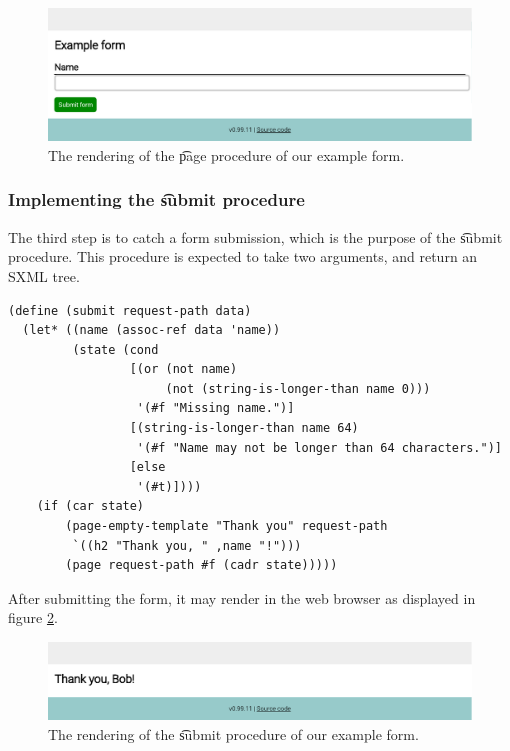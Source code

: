   \begin{figure}[H]
    \begin{center}
      \includegraphics[width=1.0\textwidth]{figures/sg-web-form-example.pdf}
    \end{center}
    \caption{The rendering of the \t{page} procedure of our example form.}
    \label{fig:web-form-example}
  \end{figure}

\subsubsection{Implementing the \t{submit} procedure}

  The third step is to catch a form submission, which is the purpose of the
  \t{submit} procedure.  This procedure is expected to take two arguments,
  and return an SXML tree.

\begin{siderules}
\begin{verbatim}
(define (submit request-path data)
  (let* ((name (assoc-ref data 'name))
         (state (cond
                 [(or (not name)
                      (not (string-is-longer-than name 0)))
                  '(#f "Missing name.")]
                 [(string-is-longer-than name 64)
                  '(#f "Name may not be longer than 64 characters.")]
                 [else
                  '(#t)])))
    (if (car state)
        (page-empty-template "Thank you" request-path
         `((h2 "Thank you, " ,name "!")))
        (page request-path #f (cadr state)))))
\end{verbatim}
\end{siderules}

  After submitting the form, it may render in the web browser as displayed
  in figure \ref{fig:web-form-submit}.

  \begin{figure}[H]
    \begin{center}
      \includegraphics[width=1.0\textwidth]{figures/sg-web-form-example-submit.pdf}
    \end{center}
    \caption{The rendering of the \t{submit} procedure of our example form.}
    \label{fig:web-form-submit}
  \end{figure}


